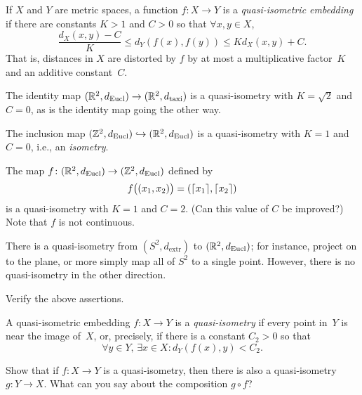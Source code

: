 \documentclass[12pt]{amsart}
\begin{document}
\begin{definition}
  If $X$ and $Y$ are metric spaces, a function $f \colon X \to Y$ is a
  \emph{quasi-isometric embedding} if there are constants $K >1$ and
  $C > 0$ so that $\forall x,y \in X$,
  \[
    \frac{d_X(x,y) - C}{K}
      \le d_Y(f(x), f(y)) \le
        K d_X(x,y) + C.
  \]
  That is, distances in $X$ are distorted by $f$ by at most a
  multiplicative factor~$K$ and an additive constant~$C$.
\end{definition}

\begin{example}
  The identity map
  $(\mathbb R^2, d_{\text{Eucl}}) \to (\mathbb R^2, d_{\text{taxi}})$ is a
  quasi-isometry with $K = \sqrt{2}$ and $C=0$, as is the identity map
  going the other way.
\end{example}

\begin{example}
  The inclusion map
  $(\mathbb Z^2,d_{\text{Eucl}}) \hookrightarrow (\mathbb R^2,d_{\text{Eucl}})$ is a
  quasi-isometry with $K=1$ and $C=0$, i.e., an \emph{isometry}.
\end{example}

\begin{example}
  The map $f \colon (\RR^2, d_{\text{Eucl}}) \to (\ZZ^2,
  d_{\text{Eucl}})$ defined by
  \[
    f\bigl((x_1,x_2)\bigr) = (\lceil x_1\rceil, \lceil x_2\rceil)
  \]
  is a quasi-isometry with $K=1$ and $C=2$. (Can this value of $C$ be
  improved?) Note that $f$ is not continuous.
\end{example}

\begin{example}
  There is a quasi-isometry from $(S^2, d_{\text{extr}})$ to
  $(\mathbb R^2, d_{\text{Eucl}})$; for instance, project on to the plane, or
  more simply map all of $S^2$ to a single point. However, there is no
  quasi-isometry in the other direction.
\end{example}

\begin{exercise}
  Verify the above assertions.
\end{exercise}

\begin{definition}
  A quasi-isometric embedding $f \colon X \to Y$ is a
  \emph{quasi-isometry} if every point in~$Y$ is near the image
  of~$X$, or, precisely, if there is a constant $C_2 > 0$ so that
  \[
    \forall y \in Y,\, \exists x \in X\colon d_Y(f(x),y) < C_2.
  \]
\end{definition}

\begin{exercise}
  Show that if $f \colon X \to Y$ is a quasi-isometry, then there is
  also a quasi-isometry $g \colon Y \to X$. What can you
  say about the composition $g \circ f$?
\end{exercise}
\end{document}
